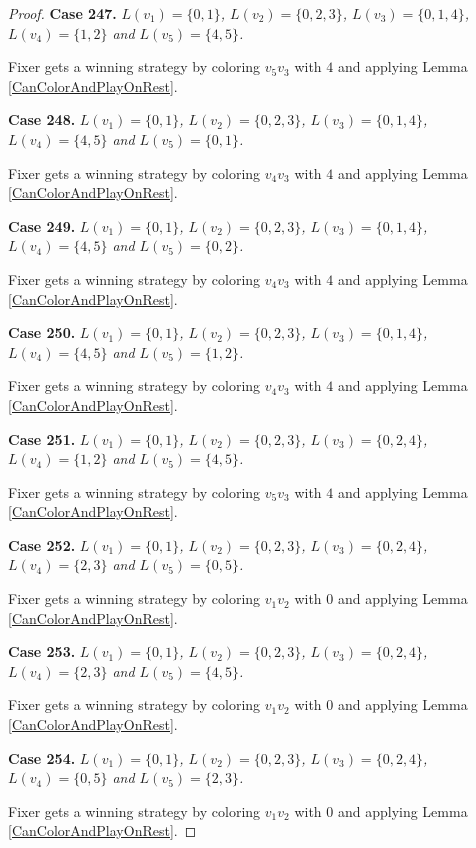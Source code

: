 \documentclass[12pt]{amsart}
\theoremstyle{plain}
\theoremstyle{definition}
\theoremstyle{remark}
\begin{document}
\begin{proof}
\noindent\textbf{Case 247.  }\textit{$L(v_1) = \{0, 1\}$, $L(v_2) = \{0, 2, 3\}$, $L(v_3) = \{0, 1, 4\}$, $L(v_4) = \{1, 2\}$ and $L(v_5) = \{4, 5\}$.}

Fixer gets a winning strategy by coloring $v_5v_3$ with $4$ and applying Lemma \ref{CanColorAndPlayOnRest}.

\noindent\textbf{Case 248.  }\textit{$L(v_1) = \{0, 1\}$, $L(v_2) = \{0, 2, 3\}$, $L(v_3) = \{0, 1, 4\}$, $L(v_4) = \{4, 5\}$ and $L(v_5) = \{0, 1\}$.}

Fixer gets a winning strategy by coloring $v_4v_3$ with $4$ and applying Lemma \ref{CanColorAndPlayOnRest}.

\noindent\textbf{Case 249.  }\textit{$L(v_1) = \{0, 1\}$, $L(v_2) = \{0, 2, 3\}$, $L(v_3) = \{0, 1, 4\}$, $L(v_4) = \{4, 5\}$ and $L(v_5) = \{0, 2\}$.}

Fixer gets a winning strategy by coloring $v_4v_3$ with $4$ and applying Lemma \ref{CanColorAndPlayOnRest}.

\noindent\textbf{Case 250.  }\textit{$L(v_1) = \{0, 1\}$, $L(v_2) = \{0, 2, 3\}$, $L(v_3) = \{0, 1, 4\}$, $L(v_4) = \{4, 5\}$ and $L(v_5) = \{1, 2\}$.}

Fixer gets a winning strategy by coloring $v_4v_3$ with $4$ and applying Lemma \ref{CanColorAndPlayOnRest}.

\noindent\textbf{Case 251.  }\textit{$L(v_1) = \{0, 1\}$, $L(v_2) = \{0, 2, 3\}$, $L(v_3) = \{0, 2, 4\}$, $L(v_4) = \{1, 2\}$ and $L(v_5) = \{4, 5\}$.}

Fixer gets a winning strategy by coloring $v_5v_3$ with $4$ and applying Lemma \ref{CanColorAndPlayOnRest}.

\noindent\textbf{Case 252.  }\textit{$L(v_1) = \{0, 1\}$, $L(v_2) = \{0, 2, 3\}$, $L(v_3) = \{0, 2, 4\}$, $L(v_4) = \{2, 3\}$ and $L(v_5) = \{0, 5\}$.}

Fixer gets a winning strategy by coloring $v_1v_2$ with $0$ and applying Lemma \ref{CanColorAndPlayOnRest}.

\noindent\textbf{Case 253.  }\textit{$L(v_1) = \{0, 1\}$, $L(v_2) = \{0, 2, 3\}$, $L(v_3) = \{0, 2, 4\}$, $L(v_4) = \{2, 3\}$ and $L(v_5) = \{4, 5\}$.}

Fixer gets a winning strategy by coloring $v_1v_2$ with $0$ and applying Lemma \ref{CanColorAndPlayOnRest}.

\noindent\textbf{Case 254.  }\textit{$L(v_1) = \{0, 1\}$, $L(v_2) = \{0, 2, 3\}$, $L(v_3) = \{0, 2, 4\}$, $L(v_4) = \{0, 5\}$ and $L(v_5) = \{2, 3\}$.}

Fixer gets a winning strategy by coloring $v_1v_2$ with $0$ and applying Lemma \ref{CanColorAndPlayOnRest}.


\end{proof}
\end{document}
